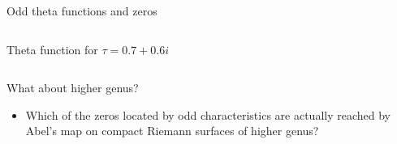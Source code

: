 \documentclass[11pt,aspectratio=169]{beamer}
\begin{document}
\begin{frame}{Odd theta functions and zeros}
\begin{columns}[onlytextwidth]
\begin{column}{0.45\textwidth}
            \tiny Theta function for $\tau = 0.7+0.6i$
            
            \cite{Cha22}
        \end{column}
    \end{columns}

    {
        \begin{block}{What about higher genus?}
            \begin{itemize}
                \item Which of the zeros located by odd characteristics are actually reached by Abel's map on compact Riemann surfaces of higher genus?
            \end{itemize}
        \end{block}
    }
\end{frame}
\end{document}
